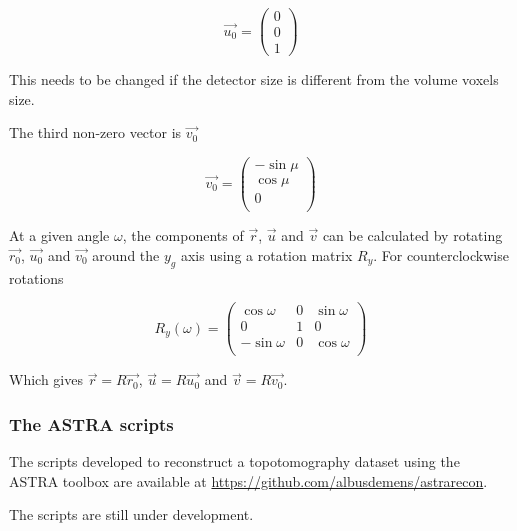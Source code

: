 \documentclass[11pt]{scrartcl}
\begin{document}
\begin{equation}
{\vec{u_0}} = \left(\begin{matrix} 
0\\ 0 \\ 1
\end{matrix}\right)
\end{equation}

\danger This needs to be changed if the detector size is different from the volume voxels size.

The third non-zero vector is ${\vec{v_0}}$

\begin{equation}
\vec{v_0} = \left(\begin{matrix}
-\sin\mu\\ \cos\mu\\ 0\\
\end{matrix}\right)
\end{equation}

At a given angle $\omega$, the components of ${\vec{r}}$, ${\vec{u}}$ and ${\vec{v}}$ can be calculated by rotating $\vec{r_0}$, $\vec{u_0}$ and $\vec{v_0}$ around the $y_g$ axis using a rotation matrix $R_y$. For counterclockwise rotations

\begin{equation}
R_y(\omega) = \begin{pmatrix}
\cos \omega & 0 & \sin \omega \\
0 & 1 & 0 \\
-\sin \omega & 0 & \cos \omega \\
\end{pmatrix}
\end{equation}

Which gives $\vec{r} = R \vec{r_0}$, $\vec{u} = R \vec{u_0}$ and $\vec{v} = R \vec{v_0}$.

\subsubsection{The ASTRA scripts}

The scripts developed to reconstruct a topotomography dataset using the {\footnotesize{ASTRA}} toolbox are available at \url{https://github.com/albusdemens/astrarecon}. 

\danger The scripts are still under development.
\end{document}

